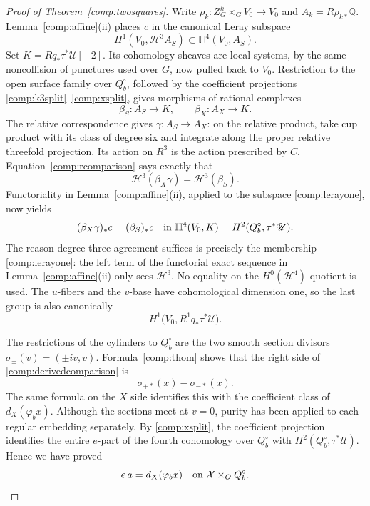 \documentclass[11pt]{amsart}
\newcommand{\Q}{\mathbb Q}
\theoremstyle{definition}
\theoremstyle{remark}
\numberwithin{equation}{section}
\begin{document}
\begin{proof}[Proof of Theorem~\ref{comp:twosquares}]
Write $\rho_k:Z^k_G\times_GV_0\to V_0$ and
$A_k=R\rho_{k*}\Q$.  Lemma~\ref{comp:affine}(ii) places $c$ in the
canonical Leray subspace
\begin{equation}\label{comp:lerayone}
 H^1(V_0,\mathcal H^3A_S)
 \subset\mathbb H^4(V_0,A_S).
\end{equation}
Set $K=Rq_*\tau^*\mathscr U[-2]$.  Its cohomology sheaves are local systems,
by the same noncollision of punctures used over $G$, now pulled back to
$V_0$.  Restriction to the open surface family
over $Q_b^\circ$, followed by the coefficient projections
\eqref{comp:k3split}--\eqref{comp:xsplit}, gives morphisms of rational
complexes
\[
 \beta_S:A_S\longrightarrow K,
 \qquad \beta_X:A_X\longrightarrow K.
\]
The relative correspondence gives $\gamma:A_S\to A_X$: on the
relative product, take cup product with its class of degree six and
integrate along the proper relative threefold projection.  Its action
on $R^3$ is the action prescribed by $C$.
Equation~\eqref{comp:rcomparison} says exactly that
\[
 \mathcal H^3(\beta_X\gamma)=\mathcal H^3(\beta_S).
\]
Functoriality in Lemma~\ref{comp:affine}(ii), applied to the subspace
\eqref{comp:lerayone}, now yields
\begin{equation}\label{comp:derivedcomparison}
 (\beta_X\gamma)_*c=(\beta_S)_*c
 \quad\hbox{in }\mathbb H^4(V_0,K)=H^2(Q_b^\circ,\tau^*\mathscr U).
\end{equation}
The reason degree-three agreement suffices is precisely the membership
\eqref{comp:lerayone}: the left term of the functorial exact sequence
in Lemma~\ref{comp:affine}(ii) only sees $\mathcal H^3$.
No equality on the $H^0(\mathcal H^4)$ quotient is used.
The $u$-fibers and the $v$-base have cohomological dimension one, so the
last group is also canonically
\[
 H^1\bigl(V_0,R^1q_*\tau^*\mathscr U\bigr).
\]

The restrictions of the cylinders to $Q_b^\circ$ are the two smooth section
divisors $\sigma_\pm(v)=(\pm iv,v)$.  Formula~\eqref{comp:thom} shows
that the right side of \eqref{comp:derivedcomparison} is
\[
 \sigma_{+*}(x)-\sigma_{-*}(x).
\]
The same formula on the $X$ side identifies this with the coefficient
class of $d_X(\varphi_bx)$.  Although the sections meet at $v=0$, purity
has been applied to each regular embedding separately.  By \eqref{comp:xsplit}, the
coefficient projection identifies the entire $e$-part of the fourth
cohomology over $Q_b^\circ$ with $H^2(Q_b^\circ,\tau^*\mathscr U)$.  Hence
we have proved
\begin{equation}\label{comp:smallopen}
 e\,a=d_X(\varphi_bx)
 \quad\hbox{on }\mathcal X\times_OQ_b^\circ.
\end{equation}


\end{proof}
\end{document}
